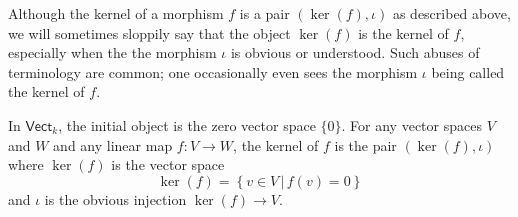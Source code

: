 \documentclass[main.tex]{subfiles}
\begin{document}
\begin{note}
  Although the kernel of a morphism $f$ is a pair $(\ker(f), \iota)$ as described above, we will sometimes sloppily say that the object $\ker(f)$ is the kernel of $f$, especially when the the morphism $\iota$ is obvious or understood. Such abuses of terminology are common; one occasionally even sees the morphism $\iota$ being called the kernel of $f$.
\end{note}

\begin{example}
  In $\mathsf{Vect}_{k}$, the initial object is the zero vector space $\{0\}$. For any vector spaces $V$ and $W$ and any linear map $f\colon V \to W$, the kernel of $f$ is the pair $(\ker(f), \iota)$ where $\ker(f)$ is the vector space
  \begin{equation*}
    \ker(f) = \left\{ v \in V \,\big|\, f(v) = 0 \right\}
  \end{equation*}
  and $\iota$ is the obvious injection $\ker(f) \to V$.
\end{example}
\end{document}
